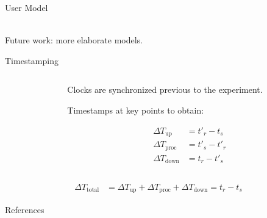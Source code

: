 \documentclass[aspectratio=1610]{beamer}
\begin{document}
\begin{frame}{User Model}
    \begin{center}
        \\
        \vspace{.1\textheight}%
        Future work: more elaborate models.
    \end{center}
\end{frame}

\begin{frame}{Timestamping}
    \begin{columns}[onlytextwidth]
        \begin{column}{.5\linewidth}
            \footnotesize%
            \raggedright%
            
        \end{column}%
        \begin{column}{.5\linewidth}
            Clocks are synchronized previous to the experiment.

            \vspace{\baselineskip}%
            Timestamps at key points to obtain:

            \begin{align}
                {\Delta}T_\text{up}   & = t'_{r} - t_{s}  \\
                {\Delta}T_\text{proc} & = t'_{s} - t'_{r} \\
                {\Delta}T_\text{down} & = t_{r} - t'_{s}
            \end{align}
        \end{column}%
    \end{columns}
    \begin{align}
        {\Delta}T_\text{total} & = {\Delta}T_\text{up} + {\Delta}T_\text{proc} + {\Delta}T_\text{down} = t_{r} - t_{s}
    \end{align}
\end{frame}

\begin{frame}[allowframebreaks, t]{References}
    \nocite{*}
    \printbibliography%
\end{frame}
\end{document}
